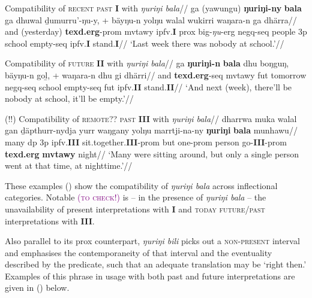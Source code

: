 \a{}\begingl Compatibility of \textsc{recent past} \textbf{I} with \textit{ŋuriŋi bala}\glpreamble//
\gla ga (yawungu) \textbf{ŋuriŋi-ny} \textbf{bala} ga dhuwal ḏumurru'-ŋu-y, + bäyŋu-n yolŋu walal wukirri waŋara-n ga dhärra//
\glb and (yesterday) \textbf{\gls{texd}.\gls{erg}}-\gls{prom} \gls{mvtawy} \gls{ipfv}.\textbf{I} \gls{prox} big-\textit{ŋu}-\gls{erg} \gls{negq}-\gls{seq} people 3p school empty-\gls{seq} \gls{ipfv}.\textbf{I} stand.\textbf{I}//
\glft`Last week there was nobody at school.'//\endgl

\a{}\begingl Compatibility of \textsc{future} \textbf{II} with \textit{ŋuriŋi bala}\glpreamble//
\gla ga \textbf{ŋuriŋi-n} \textbf{bala} dhu boŋguŋ, bäyŋu-n goḻ, + waŋara-n dhu gi dhärri//
\glb and \textbf{\gls{texd}.\gls{erg}}-\gls{seq} \gls{mvtawy} \gls{fut} tomorrow  \gls{negq}-\gls{seq} school empty-\gls{seq} \gls{fut} \gls{ipfv}.\textbf{II} stand.\textbf{II}//
\glft`And next (week), there'll be nobody at school, it'll be empty.'//\endgl


\a{}\begingl\glpreamble (!!) Compatibility of \textsc{remote?? past} \textbf{III} with \textit{ŋuriŋi bala}//
\gla dharrwa muka  walal gan ḏäpthurr-nydja yurr waŋgany yolŋu marrtji-na-ny \textbf{ŋuriŋi} \textbf{bala} munhawu//
\glb many \gls{dp} 3p \gls{ipfv}.\textbf{III} sit.together.\textbf{III}-\gls{prom} but one-\gls{prom} person go-\textbf{III}-\gls{prom} \textbf{ \gls{texd}.\gls{erg}} \textbf{\gls{mvtawy}} night//
\glft`Many were sitting around, but only a single person went at that time, at nighttime.'//
\endgl{}
\xe

These examples (\lastx) show the compatibility of \textit{ŋuriŋi bala} across inflectional categories. Notable \textcolor{purple}{\textsc{(to check!)}} is -- in the presence of \textit{ŋuriŋi bala} -- the unavailability of present interpretations with \textbf{I} and \textsc{today future/past} interpretations with \textbf{III}.

Also parallel to its \gls{prox} counterpart, \textit{ŋuriŋi bili} picks out a \textsc{non-present} interval and emphasises the contemporaneity of that interval and the eventuality described by the predicate, such that an adequate translation may be `right then.' Examples of this phrase in usage with both past and future interpretations are given in (\nextx) below.





